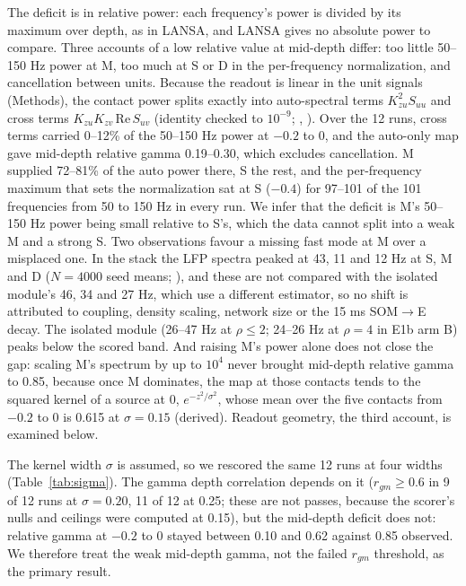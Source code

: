The deficit is in relative power: each frequency's power is divided by its maximum over depth, as in LANSA, and
LANSA gives no absolute power to compare. Three accounts of a low relative value at mid-depth differ: too little
50--150 Hz power at M, too much at S or D in the per-frequency normalization, and cancellation between units.
Because the readout is linear in the unit signals (Methods), the contact power splits exactly into auto-spectral
terms $K_{zu}^2 S_{uu}$ and cross terms $K_{zu}K_{zv}\,\mathrm{Re}\,S_{uv}$ (identity checked to $10^{-9}$;
, ). Over the 12 runs, cross terms carried 0--12\% of the 50--150 Hz power at $-0.2$ to 0, and the
auto-only map gave mid-depth relative gamma 0.19--0.30, which excludes cancellation. M supplied 72--81\% of the
auto power there, S the rest, and the per-frequency maximum that sets the normalization sat at S ($-0.4$) for
97--101 of the 101 frequencies from 50 to 150 Hz in every run. We infer that the deficit is M's 50--150 Hz power being
small relative to S's, which the data cannot split into a weak M and a strong S. Two observations favour a missing
fast mode at M over a misplaced one. In the stack the LFP spectra peaked at 43, 11 and 12 Hz at S, M and D ($N = 4000$
seed means; ), and these are not compared with the isolated module's 46, 34 and 27 Hz, which use a different estimator, so no shift is attributed to coupling,
density scaling, network size or the 15 ms SOM$\to$E decay. The isolated module (26--47 Hz at $\rho \leq 2$; 24--26 Hz at $\rho = 4$ in E1b arm B) peaks below the
scored band. And raising M's power alone does not close the gap: scaling M's spectrum by up to $10^4$ never brought
mid-depth relative gamma to 0.85, because once M dominates, the map at those contacts tends to the squared kernel
of a source at 0, $e^{-z^2/\sigma^2}$, whose mean over the five contacts from $-0.2$ to 0 is 0.615 at $\sigma =
0.15$ (derived). Readout geometry, the third account, is examined below.

The kernel width $\sigma$ is assumed, so we rescored the same 12 runs at four widths (Table~\ref{tab:sigma}). The
gamma depth correlation depends on it ($r_{gm} \geq 0.6$ in 9 of 12 runs at $\sigma = 0.20$, 11 of 12 at 0.25;
these are not passes, because the scorer's nulls and ceilings were computed at 0.15), but the mid-depth deficit
does not: relative gamma at $-0.2$ to 0 stayed between 0.10 and 0.62 against 0.85 observed. We therefore treat the
weak mid-depth gamma, not the failed $r_{gm}$ threshold, as the primary result.

